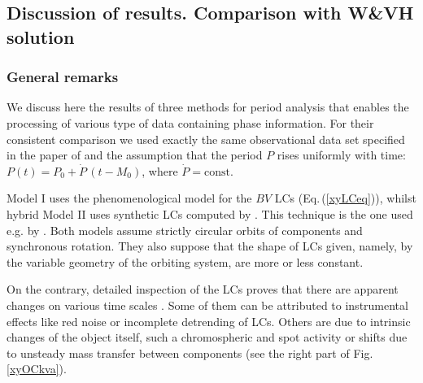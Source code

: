 \documentclass{aa}
\newcommand{\w}{\citet{wilson14}}
\begin{document}
\subsection{Discussion of results. Comparison with W\&VH solution}\label{xyresults}

\subsubsection{General remarks}
We discuss here the results of three methods for period analysis that enables the processing of various type of data containing phase information. For their consistent comparison we used exactly the same observational data set specified in the paper of \citet{wilson14} and the assumption that the period $P$ rises uniformly with time: $P(t)=P_0+\dot{P}\,(t-M_0)$, where $\dot{P}=\mathrm{const}$.

Model I uses the phenomenological model for the $BV$ LCs (Eq.\,(\ref{xyLCeq})), whilst hybrid Model II uses synthetic LCs computed by \w. This technique is the one used e.g. by \citet{zasche14,zasche15}. Both  models assume strictly circular orbits of components and synchronous rotation. They also suppose that the shape of LCs given, namely, by the variable geometry of the orbiting system, are more or less constant.

On the contrary, detailed inspection of the LCs proves that there are apparent changes on various time scales \citep[see Fig.\,\ref{xyLCresfig} and $BV$ light curves in Fig.\,3 in][]{wilson14}.
Some of them can be attributed to instrumental effects like red noise \citep{pont} or incomplete detrending of LCs. Others are due to intrinsic changes of the object itself, such a chromospheric and spot activity or shifts due to unsteady mass transfer between components (see the right part of Fig.\,\ref{xyOCkva}).
\end{document}
